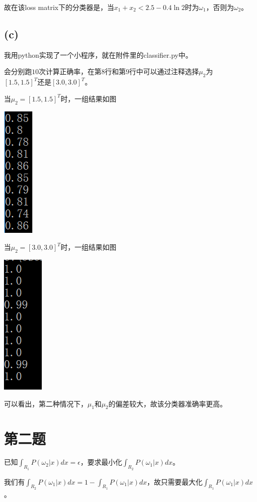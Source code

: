 \documentclass{ctexart}
\begin{document}
故在该loss matrix下的分类器是，当$x_1+x_2<2.5-0.4\ln2$时为$\omega_1$，否则为$\omega_2$。
\subsection*{(c)}
我用python实现了一个小程序，就在附件里的classifier.py中。

会分别跑$10$次计算正确率，在第$8$行和第$9$行中可以通过注释选择$\mu_2$为$[1.5,1.5]^T\textrm{还是}[3.0,3.0]^T$。

当$\mu_2=[1.5,1.5]^T$时，一组结果如图

\includegraphics{1.png}

当$\mu_2=[3.0,3.0]^T$时，一组结果如图

\includegraphics{2.png}

可以看出，第二种情况下，$\mu_1$和$\mu_2$的偏差较大，故该分类器准确率更高。
\section*{第二题}
已知$\int_{R_1}P(\omega_2|x)dx=\epsilon$，要求最小化$\int_{R_2}P(\omega_1|x)dx$。

我们有$\int_{R_2}P(\omega_1|x)dx=1-\int_{R_1}P(\omega_1|x)dx$，故只需要最大化$\int_{R_1}P(\omega_1|x)dx$。
\end{document}
